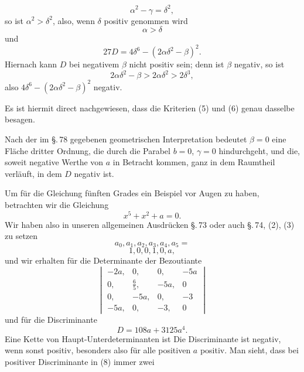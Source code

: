 \[
\alpha^2 - \gamma = \delta^2,
\]
so ist $\alpha^2 > \delta^2$, also, wenn $\delta$ positiv genommen wird
\[
\alpha > \delta
\]
und
\[
27 D = 4 \delta^6 - (2\alpha\delta^2 - \beta)^2.
\]
Hiernach kann $D$ bei negativem $\beta$ nicht positiv sein; denn ist $\beta$ negativ, so ist
\[
2\alpha\delta^2 - \beta > 2\alpha\delta^2 > 2\delta^3,
\]
also $4\delta^6 - (2\alpha\delta^2 - \beta)^2$ negativ.

Es ist hiermit direct nachgewiesen, dass die Kriterien (5) und (6) genau dasselbe besagen.

Nach der im \S.\,78 gegebenen geometrischen Interpretation bedeutet $\beta = 0$ eine Fläche dritter Ordnung, die durch die Parabel $b = 0$, $\gamma = 0$ hindurchgeht, und die, soweit negative Werthe von $a$ in Betracht kommen, ganz in dem Raumtheil verläuft, in dem $D$ negativ ist.

Um für die Gleichung fünften Grades ein Beispiel vor Augen zu haben, betrachten wir die Gleichung
\[
x^5 + x^2 + a = 0.
\]
Wir haben also in unseren allgemeinen Ausdrücken \S.\,73 oder auch \S.\,74, (2), (3) zu setzen
\[
a_0, a_1, a_2, a_3, a_4, a_5 =
\]
\[
1, 0, 0, 1, 0, a,
\]
und wir erhalten für die Determinante der Bezoutiante
\[
\begin{vmatrix}
-2a, & 0, & 0, & -5a \\
0, & \tfrac{6}{5}, & -5a, & 0 \\
0, & -5a, & 0, & -3 \\
-5a, & 0, & -3, & 0
\end{vmatrix}
\]
und für die Discriminante
\[
D = 108 a + 3125 a^4.
\]
Eine Kette von Haupt-Unterdeterminanten ist
Die Discriminante ist negativ, wenn
sonst positiv, besonders also für alle positiven $a$ positiv. Man sieht, dass bei positiver Discriminante in (8) immer zwei
